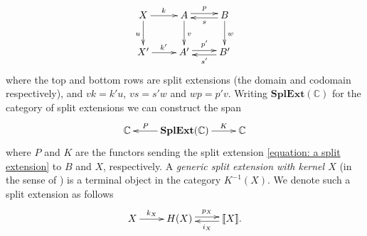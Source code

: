 \documentclass{article}
\newcommand{\C}{\mathbb{C}}
\newcommand{\SE}[1]{\mathbf{SplExt}(#1)}
\newcommand{\spexc}[1]{\llbracket#1\rrbracket}
\begin{document}
\begin{equation}
\label{equation: morphism of split ext}
\vcenter{
\xymatrix{
X \ar[r]^{k} \ar[d]_{u}& A \ar@<0.5ex>[r]^{p}\ar[d]^{v} & B\ar@<0.5ex>[l]^{s}\ar[d]^{w}\\
X' \ar[r]^{k'} & A' \ar@<0.5ex>[r]^{p'} & B'\ar@<0.5ex>[l]^{s'}
}
}
\end{equation}
where the top and bottom rows are split extensions (the domain and codomain respectively), and $vk = k' u$, $vs = s' w$ and $wp=p'v$.
Writing $\SE{\C}$ for the category of split extensions we can construct the span
\begin{equation}
\label{split ext span}
\xymatrix{
\C & \SE{\C} \ar[l]_-{P} \ar[r]^-{K} & \C
}
\end{equation}
where $P$ and $K$ are the functors sending the split extension \eqref{equation: a split extension} to $B$ and $X$, respectively. A \emph{generic split extension with kernel $X$} (in the sense
of \cite{BORCEUX_JANELIDZE_KELLY:2005a}) is a terminal object in the category $K^{-1}(X)$. We denote such a split extension as follows
\begin{equation}
\label{equation: generic split extension}
	\xymatrix{X \ar[r]^-{k_X} & H(X) \ar@<0.5ex>[r]^-{p_X} & \spexc{X}. \ar@<0.5ex>[l]^-{i_X}}
\end{equation}
\end{document}
